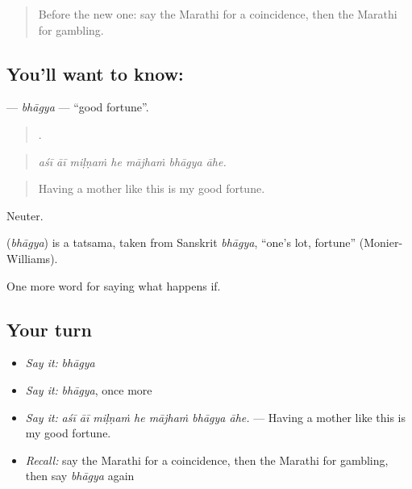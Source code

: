 \label{lesson:MR-C550-bhagya}



\begin{quote}
Before the new one: say the Marathi for a coincidence, then the Marathi for gambling.
\end{quote}

\subsection*{You'll want to know: }
\textbf{} — \emph{bhāgya} — \textquotedblleft{}good fortune\textquotedblright{}.

\begin{quote}
      .
\end{quote}

\begin{quote}
\emph{aśī āī miḷṇaṁ he mājhaṁ bhāgya āhe.}
\end{quote}

\begin{quote}
Having a mother like this is my good fortune.
\end{quote}

Neuter.

\begin{cousinweb}
\textbf{} (\emph{bhāgya}) is a tatsama, taken from Sanskrit \emph{bhāgya}, \textquotedblleft{}one's lot, fortune\textquotedblright{} (Monier-Williams).
\end{cousinweb}

\begin{grammarlens}[title={What you've built}]
One more word for saying what happens if.
\end{grammarlens}

\subsection*{Your turn}
\begin{itemize}
\raggedright
  \item \emph{Say it:} \emph{bhāgya}
  \item \emph{Say it:} \emph{bhāgya}, once more
  \item \emph{Say it:} \emph{aśī āī miḷṇaṁ he mājhaṁ bhāgya āhe.} — Having a mother like this is my good fortune.
  \item \emph{Recall:} say the Marathi for a coincidence, then the Marathi for gambling, then say \emph{bhāgya} again
\end{itemize}

